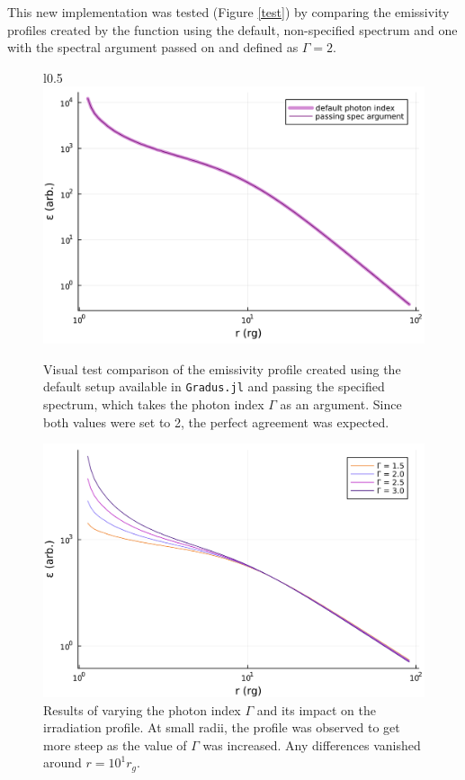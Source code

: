\documentclass[fleqn,usenatbib,useAMS]{mnras}
\begin{document}
This new implementation was tested (Figure \ref{test}) by comparing the emissivity profiles created by the function using the default, non-specified spectrum and one with the spectral argument passed on and defined as $\Gamma = 2$.

\begin{figure}{l}{0.5\textwidth}
\includegraphics[width=\linewidth]{figures/test.png}
\caption{Visual test comparison of the emissivity profile created using the default setup available in {\tt Gradus.jl} and passing the specified spectrum, which takes the photon index $\Gamma$ as an argument. Since both values were set to 2, the perfect agreement was expected.}
\label{test}

\includegraphics[width=\linewidth]{figures/photonindex.png}
\caption{Results of varying the photon index $\Gamma$ and its impact on the irradiation profile. At small radii, the profile was observed to get more steep as the value of $\Gamma$ was increased. Any differences vanished around $r = 10^{1} r_{g}$.}
\label{photonindex}
\end{figure}
\end{document}
